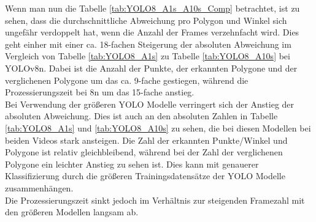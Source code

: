 {	Wenn man nun die Tabelle \ref{tab:YOLO8_A1s_A10s_Comp} betrachtet, ist zu sehen, dass die durchschnittliche Abweichung pro Polygon und Winkel sich ungefähr verdoppelt hat, wenn die Anzahl der Frames verzehnfacht wird. Dies geht einher mit einer ca. 18-fachen Steigerung der absoluten Abweichung im Vergleich von Tabelle \ref{tab:YOLO8_A1s} zu Tabelle \ref{tab:YOLO8_A10s} bei YOLOv8n. Dabei ist die Anzahl der Punkte, der erkannten Polygone und der verglichenen Polygone um das ca. 9-fache gestiegen, während die Prozessierungszeit bei 8n um das 15-fache anstieg. \\
	Bei Verwendung der größeren YOLO Modelle verringert sich der Anstieg der absoluten Abweichung. Dies ist auch an den absoluten Zahlen in Tabelle \ref{tab:YOLO8_A1s} und \ref{tab:YOLO8_A10s} zu sehen, die bei diesen Modellen bei beiden Videos stark ansteigen. Die Zahl der erkannten Punkte/Winkel und Polygone ist relativ gleichbleibend, während bei der Zahl der verglichenen Polygone ein leichter Anstieg zu sehen ist. Dies kann mit genauerer Klassifizierung durch die größeren Trainingsdatensätze der YOLO Modelle zusammenhängen. \\
	Die Prozessierungszeit sinkt jedoch im Verhältnis zur steigenden Framezahl mit den größeren Modellen langsam ab.

}
